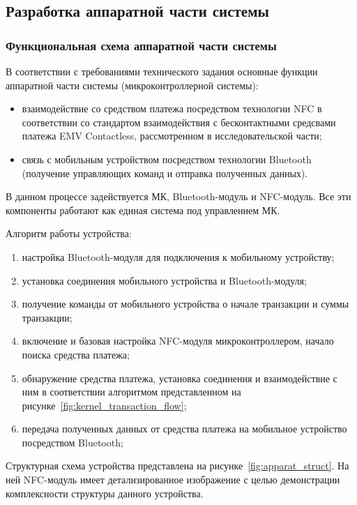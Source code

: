 \subsection{Разработка аппаратной части системы}

\subsubsection{Функциональная схема аппаратной части системы}

В соответствии с требованиями технического задания основные функции аппаратной части системы (микроконтроллерной системы):
\begin{itemize}
    \item взаимодействие со средством платежа посредством технологии NFC в соответствии со стандартом взаимодействия с бесконтактными средсвами платежа EMV Contactless, рассмотренном в исследовательской части;
    \item связь с мобильным устройством посредством технологии Bluetooth (получение управляющих команд и отправка полученных данных).
\end{itemize}

В данном процессе задействуется МК, Bluetooth-модуль и NFC-модуль.
Все эти компоненты работают как единая система под управлением МК.

Алгоритм работы устройства:
\begin{enumerate}
    \item настройка Bluetooth-модуля для подключения к мобильному устройству;
    \item установка соединения мобильного устройства и Bluetooth-модуля;
    \item получение команды от мобильного устройства о начале транзакции и суммы транзакции;
    \item включение и базовая настройка NFC-модуля микроконтроллером, начало поиска средства платежа;
    \item обнаружение средства платежа, установка соединения и взаимодействие с ним в соответствии алгоритмом представленном на рисунке~\ref{fig:kernel_transaction_flow}; %
    \item передача полученных данных от средства платежа на мобильное устройство посредством Bluetooth;
\end{enumerate}

Структурная схема устройства представлена на рисунке~\ref{fig:apparat_struct}.
На ней NFC-модуль имеет детализированное изображение с целью демонстрации комплексности структуры данного устройства.

